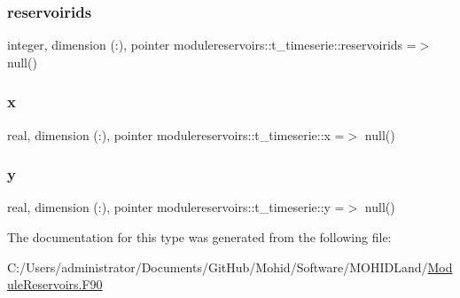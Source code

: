 \subsubsection{\texorpdfstring{reservoirids}{reservoirids}}
{\footnotesize\ttfamily integer, dimension (\+:), pointer modulereservoirs\+::t\+\_\+timeserie\+::reservoirids =$>$ null()\hspace{0.3cm}{\ttfamily [private]}}

\mbox{\label{structmodulereservoirs_1_1t__timeserie_a848cd1aab5abc96a9eb205579a8820e5}} 
\subsubsection{\texorpdfstring{x}{x}}
{\footnotesize\ttfamily real, dimension (\+:), pointer modulereservoirs\+::t\+\_\+timeserie\+::x =$>$ null()\hspace{0.3cm}{\ttfamily [private]}}

\mbox{\label{structmodulereservoirs_1_1t__timeserie_a6405e2f4687d9681935985f99a9cf2ad}} 
\subsubsection{\texorpdfstring{y}{y}}
{\footnotesize\ttfamily real, dimension (\+:), pointer modulereservoirs\+::t\+\_\+timeserie\+::y =$>$ null()\hspace{0.3cm}{\ttfamily [private]}}



The documentation for this type was generated from the following file\+:\begin{DoxyCompactItemize}
\item 
C\+:/\+Users/administrator/\+Documents/\+Git\+Hub/\+Mohid/\+Software/\+M\+O\+H\+I\+D\+Land/\mbox{\hyperlink{_module_reservoirs_8_f90}{Module\+Reservoirs.\+F90}}\end{DoxyCompactItemize}
